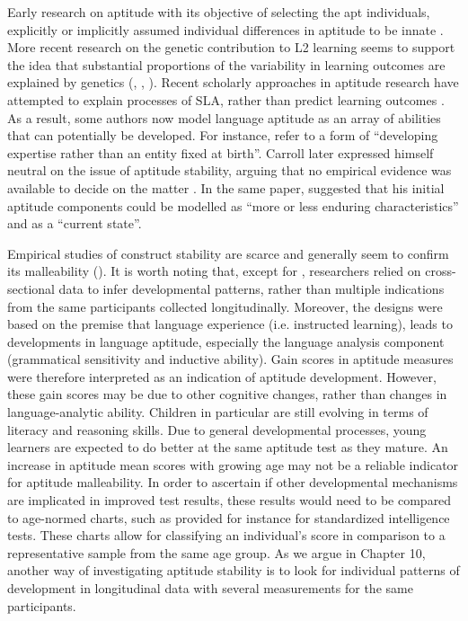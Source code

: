 \documentclass[output=paper]{langscibook}
\begin{document}
Early research on aptitude with its objective of selecting the apt individuals, explicitly or implicitly assumed individual differences in aptitude to be innate \parencites[122]{Carroll1964}[8]{Carroll1973}. More recent research on the genetic contribution to L2 learning seems to support the idea that substantial proportions of the variability in learning outcomes are explained by genetics (\citealt{Stromswold2001}, \citealt{RimfeldEtAl2015}, \citealt{Plomin2019}). Recent scholarly approaches in aptitude research have attempted to explain processes of SLA, rather than predict learning outcomes \citep{WenEtAl2019}. As a result, some authors now model language aptitude as an array of abilities that can potentially be developed. For instance, \citet[401]{GrigorenkoEtAl2000} refer to a form of “developing expertise rather than an entity fixed at birth”. Carroll later expressed himself neutral on the issue of aptitude stability, arguing that no empirical evidence was available to decide on the matter \citep[86]{Carroll1981}. In the same paper, \citet[84]{Carroll1981} suggested that his initial aptitude components could be modelled as “more or less enduring characteristics” and as a “current state”.

\begin{sloppypar}
Empirical studies of construct stability are scarce and generally seem to confirm its malleability (\citealt{SafarKormos2008,SuarezVilagran2010,RoehrBrackinTellier2019}). It is worth noting that, except for \citealt{RoehrBrackinTellier2019}, researchers relied on cross-sectional data to infer developmental patterns, rather than multiple indications from the same participants collected longitudinally. Moreover, the designs were based on the premise that language experience (i.e. instructed learning), leads to developments in language aptitude, especially the language analysis component (grammatical sensitivity and inductive ability). Gain scores in aptitude measures were therefore interpreted as an indication of aptitude development. However, these gain scores may be due to other cognitive changes, rather than changes in language-analytic ability. Children in particular are still evolving in terms of literacy and reasoning skills. Due to general developmental processes, young learners are expected to do better at the same aptitude test as they mature. An increase in aptitude mean scores with growing age may not be a reliable indicator for aptitude malleability. In order to ascertain if other developmental mechanisms are implicated in improved test results, these results would need to be compared to age-normed charts, such as provided for instance for standardized intelligence tests. These charts allow for classifying an individual’s score in comparison to a representative sample from the same age group. As we argue in Chapter 10, another way of investigating aptitude stability is to look for individual patterns of development in longitudinal data with several measurements for the same participants.
\end{sloppypar}
\end{document}
